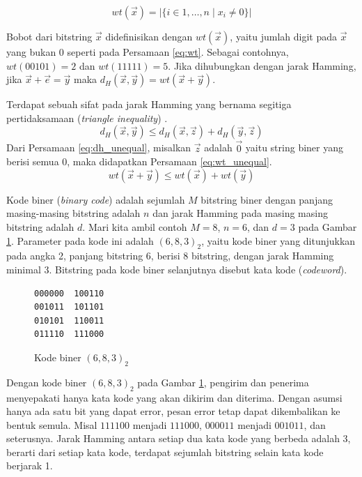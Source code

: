 \documentclass[conference,compsoc]{IEEEtran}
\newcommand{\refeq}[1]{Persamaan \ref{#1}}
\begin{document}
\begin{equation} \label{eq:wt}
wt(\vec{x}) = |\{i \in {1,\ldots,n} \mid x_i \neq 0\}|
\end{equation}

Bobot dari bitstring $\vec{x}$ didefinisikan dengan $wt(\vec{x})$, yaitu jumlah digit pada $\vec{x}$ yang bukan $0$ seperti pada \refeq{eq:wt}. Sebagai contohnya, $wt(00101) = 2$ dan $wt(11111) = 5$. Jika dihubungkan dengan jarak Hamming, jika $\vec{x}+\vec{e} = \vec{y}$ maka $d_H(\vec{x},\vec{y}) = wt(\vec{x}+\vec{y})$.

Terdapat sebuah sifat pada jarak Hamming yang bernama segitiga pertidaksamaan (\textit{triangle inequality}) \cite{VanLint2016}.
\begin{equation} \label{eq:dh_unequal}
d_H(\vec{x},\vec{y}) \le d_H(\vec{x},\vec{z}) + d_H(\vec{y},\vec{z})
\end{equation}
Dari \refeq{eq:dh_unequal}, misalkan $\vec{z}$ adalah $\vec{0}$ yaitu string biner yang berisi semua $0$, maka didapatkan \refeq{eq:wt_unequal}.
\begin{equation} \label{eq:wt_unequal}
wt(\vec{x}+\vec{y}) \le wt(\vec{x}) + wt(\vec{y})
\end{equation}

Kode biner (\textit{binary code}) adalah sejumlah $M$ bitstring biner dengan panjang masing-masing bitstring adalah $n$ dan jarak Hamming pada masing masing bitstring adalah $d$. Mari kita ambil contoh $M=8$, $n=6$, dan $d=3$ pada Gambar \ref{fig:binarycode683}. Parameter pada kode ini adalah $(6,8,3)_2$, yaitu kode biner yang ditunjukkan pada angka 2, panjang bitstring 6, berisi 8 bitstring, dengan jarak Hamming minimal 3. Bitstring pada kode biner selanjutnya disebut kata kode (\textit{codeword}).

\begin{figure}
\centering
\begin{BVerbatim}
000000  100110
001011  101101
010101  110011
011110  111000
\end{BVerbatim}
\caption{Kode biner $(6,8,3)_2$}
\label{fig:binarycode683}
\end{figure}

Dengan kode biner $(6,8,3)_2$ pada Gambar \ref{fig:binarycode683}, pengirim dan penerima menyepakati hanya kata kode yang akan dikirim dan diterima. Dengan asumsi hanya ada satu bit yang dapat error, pesan error tetap dapat dikembalikan ke bentuk semula. Misal $111100$ menjadi $111000$, $000011$ menjadi $001011$, dan seterusnya. Jarak Hamming antara setiap dua kata kode yang berbeda adalah 3, berarti dari setiap kata kode, terdapat sejumlah bitstring selain kata kode berjarak 1.
\end{document}
